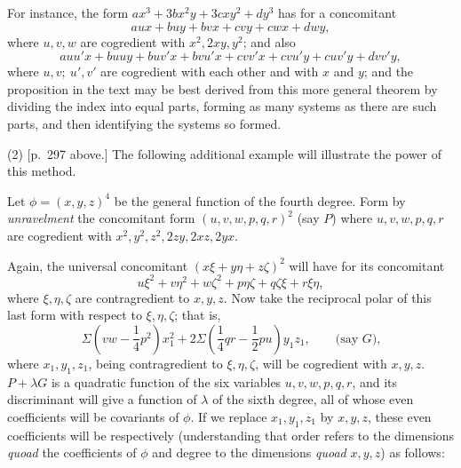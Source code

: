 \documentclass[11pt]{article}
\begin{document}
{{For instance, the form $ax^3+3bx^2y+3cxy^2+dy^3$ has for a concomitant
\[
aux+buy+bvx+cvy+cwx+dwy,
\]
where $u,v,w$ are cogredient with $x^2,2xy,y^2$; and also
\[
auu'x+buuy+buv'x+bvu'x+cvv'x+cvu'y+cuv'y+dvv'y,
\]
where $u,v;\ u',v'$ are cogredient with each other and with $x$ and $y$; and the proposition in the text may be best derived from this more general theorem by dividing the index into equal parts, forming as many systems as there are such parts, and then identifying the systems so formed.

(2) [p.~297 above.] The following additional example will illustrate the power of this method.

Let $\phi=(x,y,z)^4$ be the general function of the fourth degree. Form by \emph{unravelment} the concomitant form $(u,v,w,p,q,r)^2$ (say $P$) where $u,v,w,p,q,r$ are cogredient with $x^2,y^2,z^2,2zy,2xz,2yx$.

Again, the universal concomitant $(x\xi+y\eta+z\zeta)^2$ will have for its concomitant
\[
u\xi^2+v\eta^2+w\zeta^2+p\eta\zeta+q\zeta\xi+r\xi\eta,
\]
where $\xi,\eta,\zeta$ are contragredient to $x,y,z$. Now take the reciprocal polar of this last form with respect to $\xi,\eta,\zeta$; that is,
\[
\Sigma\left(vw-\frac14p^2\right)x_1^2
+2\Sigma\left(\frac14qr-\frac12pu\right)y_1z_1,\qquad \text{(say }G\text{),}
\]
where $x_1,y_1,z_1$, being contragredient to $\xi,\eta,\zeta$, will be cogredient with $x,y,z$. $P+\lambda G$ is a quadratic function of the six variables $u,v,w,p,q,r$, and its discriminant will give a function of $\lambda$ of the sixth degree, all of whose even coefficients will be covariants of $\phi$. If we replace $x_1,y_1,z_1$ by $x,y,z$, these even coefficients will be respectively (understanding that order refers to the dimensions \emph{quoad} the coefficients of $\phi$ and degree to the dimensions \emph{quoad} $x,y,z$) as follows:

}}
\end{document}
